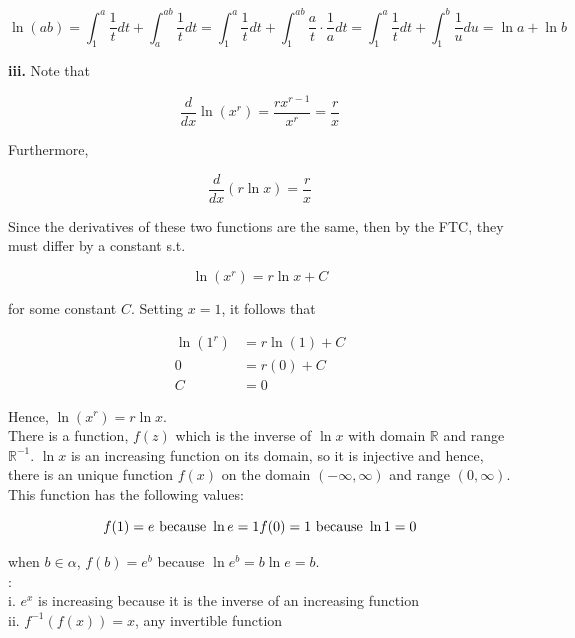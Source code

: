         \[
            \ln{(ab)} = \int_1^a \frac{1}{t}dt + \int_a^{ab} \frac{1}{t}dt = \int_1^a \frac{1}{t}dt + \int_1^{ab} \frac{a}{t}\cdot\frac{1}{a}dt = \int_1^a \frac{1}{t}dt + \int_1^b \frac{1}{u}du = \ln{a} + \ln{b}
        \]

        \textbf{iii.} Note that

        \[
            \frac{d}{dx}\ln{\left(x^r\right)} = \frac{rx^{r-1}}{x^r} = \frac{r}{x}
        \]

        Furthermore,

        \[
            \frac{d}{dx}\left(r\ln{x}\right) = \frac{r}{x}
        \]

        Since the derivatives of these two functions are the same, then by the FTC, they must differ by a constant s.t.

        \[
            \ln{\left(x^r\right)} = r\ln{x} + C
        \]

        for some constant $C$. Setting $x=1$, it follows that

        \begin{align*}
            \ln{\left(1^r\right)}   &= r\ln{(1)} + C \\
            0                       &= r(0) + C \\
            C                       &= 0
        \end{align*}

        Hence, $\ln{\left(x^r\right)} = r\ln{x}$. \\

        There is a function, $f(z)$ which is the inverse of $\ln{x}$ with domain $\mathbb{R}$ and range $\mathbb{R}^{-1}$. $\ln{x}$ is an increasing function on its domain, so it is injective and hence, there is an
        unique function $f(x)$ on the domain $\left(-\infty, \infty\right)$ and range $\left(0,\infty\right)$. This function has the following values:

        \[
            f(1) = e \text{ because } \ln{e} = 1 \\
            f(0) = 1 \text{ because } \ln{1} = 0
        \]

        when $b\in \alpha$, $f(b) = e^b$ because $\ln{e^b} = b\ln{e} = b$. \\

        : \\
        i. $e^x$ is increasing because it is the inverse of an increasing function \\
        ii. $f^{-1}\left(f(x)\right) = x$, any invertible function

